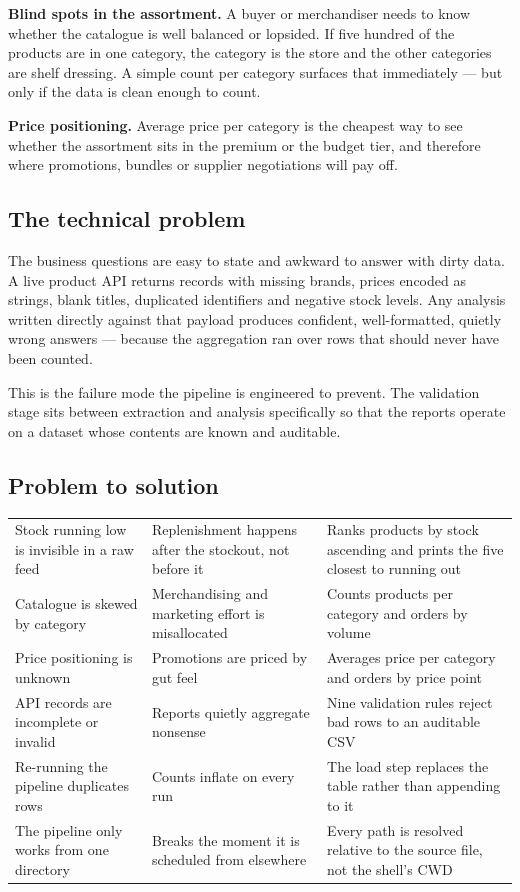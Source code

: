 \textbf{Blind spots in the assortment.} A buyer or merchandiser needs to know
whether the catalogue is well balanced or lopsided. If five hundred of the
products are in one category, the category is the store and the other
categories are shelf dressing. A simple count per category surfaces that
immediately --- but only if the data is clean enough to count.

\textbf{Price positioning.} Average price per category is the cheapest way
to see whether the assortment sits in the premium or the budget tier, and
therefore where promotions, bundles or supplier negotiations will pay off.

\subsection{The technical problem}

The business questions are easy to state and awkward to answer with dirty
data. A live product API returns records with missing brands, prices encoded
as strings, blank titles, duplicated identifiers and negative stock levels.
Any analysis written directly against that payload produces confident,
well-formatted, quietly wrong answers --- because the aggregation ran over
rows that should never have been counted.

This is the failure mode the pipeline is engineered to prevent. The
validation stage sits between extraction and analysis specifically so that
the reports operate on a dataset whose contents are known and auditable.

\subsection{Problem to solution}

\noindent
\begin{tabularx}{\textwidth}{@{}L{3.6cm}L{3.9cm}Y@{}}
 &  &  \\
\midrule
Stock running low is invisible in a raw feed &
Replenishment happens after the stockout, not before it &
Ranks products by stock ascending and prints the five closest to running out \\
\addlinespace
Catalogue is skewed by category &
Merchandising and marketing effort is misallocated &
Counts products per category and orders by volume \\
\addlinespace
Price positioning is unknown &
Promotions are priced by gut feel &
Averages price per category and orders by price point \\
\addlinespace
API records are incomplete or invalid &
Reports quietly aggregate nonsense &
Nine validation rules reject bad rows to an auditable CSV \\
\addlinespace
Re-running the pipeline duplicates rows &
Counts inflate on every run &
The load step replaces the table rather than appending to it \\
\addlinespace
The pipeline only works from one directory &
Breaks the moment it is scheduled from elsewhere &
Every path is resolved relative to the source file, not the shell's CWD \\
\end{tabularx}

